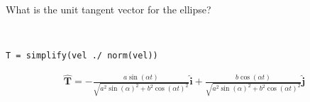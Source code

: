 What is the unit tangent vector for the ellipse?

\begin{solution} \
\begin{lstlisting}
T = simplify(vel ./ norm(vel))
\end{lstlisting}

\begin{align*}
    \hat{\boldsymbol{T}} = -\frac{a \sin(\alpha t)}{\sqrt{a^2 \sin(\alpha)^2 + b^2 \cos(\alpha t)^2}} \hat{\boldsymbol{i}} + \frac{b \cos(\alpha t)}{\sqrt{a^2 \sin(\alpha)^2 + b^2 \cos(\alpha t)^2}} \hat{\boldsymbol{j}}
\end{align*}
\end{solution}
